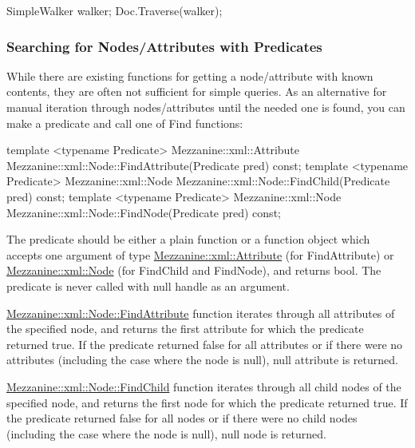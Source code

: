\begin{DoxyCode}
 SimpleWalker walker;
 Doc.Traverse(walker);
\end{DoxyCode}
 \hypertarget{XMLManual_XMLAccessingPredicates}{}\subsubsection{Searching for Nodes/Attributes with Predicates}\label{XMLManual_XMLAccessingPredicates}
While there are existing functions for getting a node/attribute with known contents, they are often not sufficient for simple queries. As an alternative for manual iteration through nodes/attributes until the needed one is found, you can make a predicate and call one of Find functions: 
\begin{DoxyCode}
 template <typename Predicate> Mezzanine::xml::Attribute 
      Mezzanine::xml::Node::FindAttribute(Predicate pred) const;
 template <typename Predicate> Mezzanine::xml::Node 
      Mezzanine::xml::Node::FindChild(Predicate pred) const;
 template <typename Predicate> Mezzanine::xml::Node 
      Mezzanine::xml::Node::FindNode(Predicate pred) const;
\end{DoxyCode}
 The predicate should be either a plain function or a function object which accepts one argument of type \hyperlink{classMezzanine_1_1xml_1_1Attribute}{Mezzanine::xml::Attribute} (for FindAttribute) or \hyperlink{classMezzanine_1_1xml_1_1Node}{Mezzanine::xml::Node} (for FindChild and FindNode), and returns bool. The predicate is never called with null handle as an argument. \par
 \par
 \hyperlink{classMezzanine_1_1xml_1_1Node_afbac679468f12378abbe025d57991fde}{Mezzanine::xml::Node::FindAttribute} function iterates through all attributes of the specified node, and returns the first attribute for which the predicate returned true. If the predicate returned false for all attributes or if there were no attributes (including the case where the node is null), null attribute is returned. \par
 \par
 \hyperlink{classMezzanine_1_1xml_1_1Node_af0b5f737f895f650faa83131a86ee2ac}{Mezzanine::xml::Node::FindChild} function iterates through all child nodes of the specified node, and returns the first node for which the predicate returned true. If the predicate returned false for all nodes or if there were no child nodes (including the case where the node is null), null node is returned. \par
